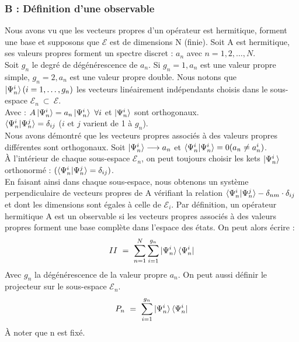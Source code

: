 \documentclass[12pt,a4paper,titlepage]{book}
\begin{document}
\subsubsection{B : Définition d'une observable}

Nous avons vu que les vecteurs propres d'un opérateur est hermitique, forment une base et supposons que $\mathcal{E}$ est de dimensions N (finie). Soit A est hermitique, ses valeurs propres forment un spectre discret : $a_n$ avec $n = 1, 2, \ldots, N$.\\

Soit $g_n$ le degré de dégénérescence de $a_n$. Si $g_n = 1, a_n$ est une valeur propre simple, $g_n = 2, a_n$ est une valeur propre double. Nous notons que $\ket{\Psi_n^i} (i = 1, \ldots, g_n)$ les vecteurs linéairement indépendants choisis dans le sous-espace $\mathcal{E}_n ~\subset~ \mathcal{E}$.\\

Avec : $A \ket{\Psi_n^i} = a_n \ket{\Psi_n^i}~\forall i$ et $\ket{\Psi_n^i}$ sont orthogonaux.\\

$\braket{\Psi_n^i | \Psi_n^j} = \delta_{i j}$ ($i$ et $j$ varient de 1 à $g_n$).\\

Nous avons démontré que les vecteurs propres associés à des valeurs propres différentes sont orthogonaux. Soit $\ket{\Psi_n^i} \longrightarrow a_n$ et $\braket{\Psi_n^i | \Psi_n^i} = 0 (a_n \neq a_n^i)$.\\

À l'intérieur de chaque sous-espace $\mathcal{E}_n$, on peut toujours choisir les kets $\ket{\Psi_n^i}$ orthonormé : $(\braket{\Psi_n^i | \Psi_n^j} = \delta_{ij})$.\\

En faisant ainsi dans chaque sous-espace, nous obtenons un système perpendiculaire de vecteurs propres de A vérifiant la relation $\braket{\Psi_n^i | \Psi_n^j} - \delta_{nm} \cdot \delta_{ij} $ et dont les dimensions sont égales à celle de $\mathcal{E}_i$. Par définition, un opérateur hermitique A est un observable si les vecteurs propres associés à des valeurs propres forment une base complète dans l'espace des états. On peut alors écrire :\\

\begin{equation*}
II ~=~ \sum\limits_{n=1}^N \sum\limits_{i=1}^{g_n} \ket{\Psi_n^i} \bra{\Psi_n^i}
\end{equation*}
Avec $g_n$ la dégénérescence de la valeur propre $a_n$. On peut aussi définir le projecteur sur le sous-espace $\mathcal{E}_n$.
\begin{equation*}
P_n ~=~ \sum\limits_{i=1}^{g_n} \ket{\Psi_n^i} \bra{\Psi_n^i}
\end{equation*}
À noter que n est fixé.\\
\end{document}
